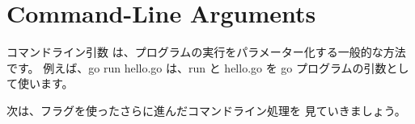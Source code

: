\section{Command-Line Arguments}

コマンドライン引数 は、プログラムの実行をパラメーター化する一般的な方法です。 例えば、go run hello.go は、run と hello.go を go プログラムの引数として使います。




次は、フラグを使ったさらに進んだコマンドライン処理を 見ていきましょう。